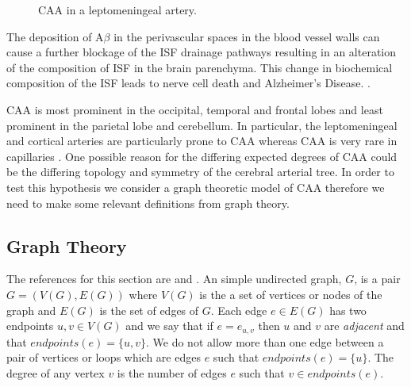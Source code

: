 \documentclass[12pt]{article} %
\theoremstyle{definition}
\begin{document}
\begin{figure}[H]

              \centering
                \caption{CAA in a leptomeningeal artery.}
\end{figure}

The deposition of A$\beta$ in the perivascular spaces in the  blood vessel walls can cause a further blockage of the ISF drainage pathways resulting in an alteration of the composition of ISF in the brain parenchyma. This change in biochemical composition of the ISF leads to nerve cell death and Alzheimer's Disease. \cite{Rox}.  

CAA  is most prominent in the occipital, temporal and frontal lobes and least prominent in the parietal lobe and cerebellum.  In particular,  the leptomeningeal and cortical arteries are particularly prone to CAA whereas CAA is very rare in capillaries \cite{Preston}.  One possible reason for the differing expected degrees of CAA could be the differing topology and symmetry of the cerebral arterial tree.  In order to test this hypothesis we consider a graph theoretic model of CAA therefore we need to make some relevant definitions from graph theory.  





\subsection{Graph Theory}\label{trees}  The references for this section are \cite{Bela} and \cite{varietiesofincreasingtrees}.
An simple undirected graph, $G$, is a pair $G = (V(G),E(G))$ where $V(G)$ is the a set of vertices or nodes of the graph and $E(G)$ is 
the set of edges of $G$.  Each edge $e \in E(G)$ has two endpoints $u,v \in V(G)$ and we say that if $e = e_{u,v}$ then $u$ and $v$ are \emph{adjacent} and that $endpoints(e) = \{u,v\}$.  We do not allow more than one edge between a pair of vertices or loops which are edges $e$ such that $endpoints(e) = \{u\}$. The degree of any vertex $v$ is the number of edges $e$ such that $v \in endpoints(e)$. 
\end{document}
